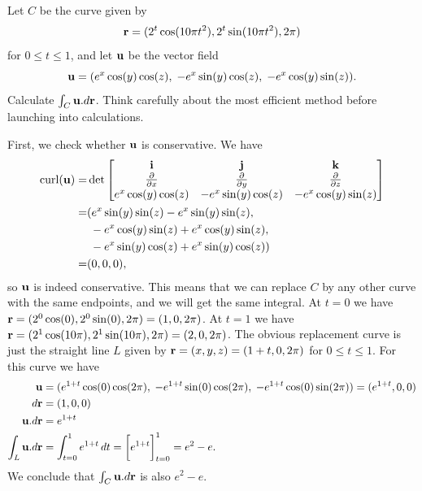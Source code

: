 \documentclass[a4paper]{amsart}
\renewenvironment{solution}{\SolutionInline}{\endSolutionInline}
\begin{document}
\begin{exercise}
 Let $C$ be the curve given by 
 \[ \mathbf{r} = (2^t\cos(10\pi t^2),2^t\sin(10\pi t^2),2\pi) \]
 for $0\leq t\leq 1$, and let $\mathbf{u}$ be the vector field
 \[ \mathbf{u} = (e^x\cos(y)\cos(z),\;
           -e^x\sin(y)\cos(z),\;
           -e^x\cos(y)\sin(z)).
 \]
 Calculate $\int_C\mathbf{u}.d\mathbf{r}$.  Think carefully about the most efficient
 method before launching into calculations.
\end{exercise}
\begin{solution}
 First, we check whether $\mathbf{u}$ is conservative.  We have
 \begin{align*}
  \operatorname{curl}(\mathbf{u}) 
   =& \det\left[\begin{matrix} \mathbf{i} & \mathbf{j} & \mathbf{k} \\
          \frac{\partial}{\partial x} & \frac{\partial}{\partial y} & \frac{\partial}{\partial z} \\
          e^x\cos(y)\cos(z) &
          -e^x\sin(y)\cos(z) & 
          -e^x\cos(y)\sin(z) \end{matrix}\right] \\
   =& (e^x\sin(y)\sin(z)-e^x\sin(y)\sin(z),\\
    & \;-e^x\cos(y)\sin(z)+e^x\cos(y)\sin(z),\\
    & \;-e^x\sin(y)\cos(z)+e^x\sin(y)\cos(z)) \\
   =& (0,0,0),
 \end{align*}
 so $\mathbf{u}$ is indeed conservative.  This means that we can replace $C$
 by any other curve with the same endpoints, and we will get the same
 integral.  At $t=0$ we have
 $\mathbf{r}=(2^0\cos(0),2^0\sin(0),2\pi)=(1,0,2\pi)$.  At $t=1$ we have
 $\mathbf{r}=(2^1\cos(10\pi),2^1\sin(10\pi),2\pi)=(2,0,2\pi)$.  The obvious
 replacement curve is just the straight line $L$ given by
 $\mathbf{r}=(x,y,z)=(1+t,0,2\pi)$ for $0\leq t\leq 1$.  For this curve we
 have 
 \begin{align*}
  \vu &= (e^{1+t}\cos(0)\cos(2\pi),\;
          -e^{1+t}\sin(0)\cos(2\pi),\;
          -e^{1+t}\cos(0)\sin(2\pi)) = (e^{1+t},0,0) \\
  d\vr &= (1,0,0) \\
  \vu.d\vr &= e^{1+t} \\
  \int_L\vu.d\vr &= \int_{t=0}^1 e^{1+t}\,dt =
    \CH{e^{1+t}}_{t=0}^1 = e^2-e.
 \end{align*}
 We conclude that $\int_C\mathbf{u}.d\mathbf{r}$ is also $e^2-e$.


\end{solution}
\end{document}
